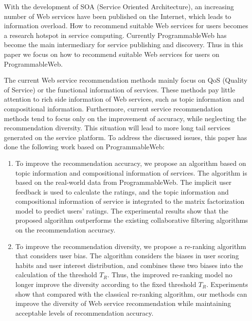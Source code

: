 \documentclass[master,winfonts]{njuthesis}
\begin{document}
\begin{englishabstract}
With the development of SOA (Service Oriented Architecture), an increasing number of Web services
have been published on the Internet, which leads to information overload. How to recommend suitable Web services for users becomes a research hotspot in service computing. Currently ProgrammableWeb has become the main intermediary for service publishing and discovery. Thus in this paper we focus on how to recommend suitable Web services for users on ProgrammableWeb.

The current Web service recommendation methods mainly focus on QoS (Quality of Service) or the functional information of services. These methods pay little attention to rich side information of Web services, such as topic information and compositional information. Furthermore, current service recommendation methods tend to focus only on the improvement of accuracy, while neglecting the recommendation diversity. This situation will lead to more long tail services generated on the service platform. To address the discussed issues, this paper has done the following work based on ProgrammableWeb:

\begin{enumerate}
\item To improve the recommendation accuracy, we propose an algorithm based on topic information and compositional information of services. The algorithm is based on the real-world data from ProgrammableWeb. The implicit user feedback is used to calculate the ratings, and the topic information and compositional information of service is integrated to the matrix factorization model to predict users' ratings. The experimental results show that the proposed algorithm outperforms the existing collaborative filtering algorithms on the recommendation accuracy.
\item To improve the recommendation diversity, we propose a re-ranking algorithm that considers user bias. The algorithm considers the biases in user scoring habits and user interest distribution, and combines these two biases into the calculation of the threshold $T_R$. Thus, the improved re-ranking model no longer improve the diversity according to the fixed threshold $T_R$. Experiments show that compared with the classical re-ranking algorithm, our methods can improve the diversity of Web service recommendation while maintaining acceptable levels of recommendation accuracy.

\end{enumerate}
\end{englishabstract}
\end{document}
